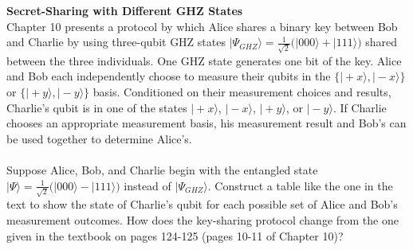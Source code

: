 \documentclass[10pt,letterpaper,boxed,cm]{hmcpset}
\newcommand{\ket}[1]{\big\lvert #1\big\rangle}
\begin{document}
\headerblock
{}
\begin{problem}[3.]
    \textbf{Secret-Sharing with Different GHZ States}\\
    Chapter 10 presents a protocol by which Alice shares a binary key between Bob and Charlie by using three-qubit GHZ states $\ket{\Psi_{GHZ}} = \frac{1}{\sqrt{2}}\bigl(\ket{000}+\ket{111}\bigr)$ shared between the three individuals.  One GHZ state generates one bit of the key.  Alice and Bob each independently choose to measure their qubits in the $\{\ket{+x},\ket{-x}\}$ or $\{\ket{+y},\ket{-y}\}$ basis.  Conditioned on their measurement choices and results, Charlie's qubit is in one of the states $\ket{+x}$, $\ket{-x}$, $\ket{+y}$, or $\ket{-y}$.  If Charlie chooses an appropriate measurement basis, his measurement result and Bob's can be used together to determine Alice's.
    \\
    \\
    Suppose Alice, Bob, and Charlie begin with the entangled state $\ket{\Psi} = \frac{1}{\sqrt{2}}\bigl(\ket{000}-\ket{111}\bigr)$ instead of $\ket{\Psi_{GHZ}}$.  Construct a table like the one in the text to show the state of Charlie's qubit for each possible set of Alice and Bob's measurement outcomes.  How does the key-sharing protocol change from the one given in the textbook on pages 124-125 (pages 10-11 of Chapter 10)?
\end{problem}

\begin{solution}
    \vfill
\end{solution}
\newpage
\end{document}
